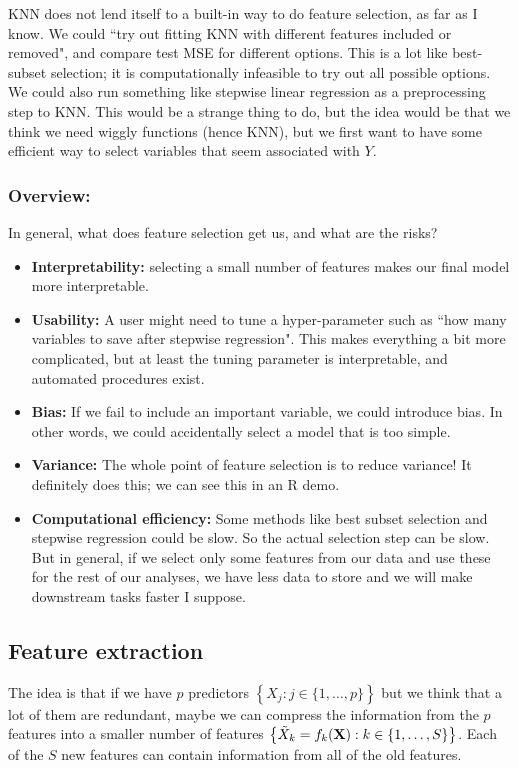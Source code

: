 KNN does not lend itself to a built-in way to do feature selection, as far as I know. We could ``try out fitting KNN with different features included or removed", and compare test MSE for different options. This is a lot like best-subset selection; it is computationally infeasible to try out all possible options. We could also run something like stepwise linear regression as a preprocessing step to KNN. This would be a strange thing to do, but the idea would be that we think we need wiggly functions (hence KNN), but we first want to have some efficient way to select variables that seem associated with $Y$.

\subsubsection{Overview:}

In general, what does feature selection get us, and what are the risks? 
\begin{itemize}
\item \textbf{Interpretability:} selecting a small number of features makes our final model more interpretable. 
\item \textbf{Usability:} A user might need to tune a hyper-parameter such as ``how many variables to save after stepwise regression". This makes everything a bit more complicated, but at least the tuning parameter is interpretable, and automated procedures exist. 
\item \textbf{Bias:} If we fail to include an important variable, we could introduce bias. In other words, we could accidentally select a model that is too simple. 
\item \textbf{Variance:} The whole point of feature selection is to reduce variance! It definitely does this; we can see this in an R demo.
\item \textbf{Computational efficiency:} Some methods like best subset selection and stepwise regression could be slow. So the actual selection step can be slow. But in general, if we select only some features from our data and use these for the rest of our analyses, we have less data to store and we will make downstream tasks faster I suppose. 
\end{itemize}


\subsection{Feature extraction}

The idea is that if we have $p$ predictors $\left\{X_j : j \in \{1,\ldots,p\}\right\}$ but we think that a lot of them are redundant, maybe we can compress the information from the $p$ features into a smaller number of features $\left\{ \tilde{X}_k = f_k(\bold{X}) : k \in \{1,\ldots, S\} \right\}$. Each of the $S$ new features can contain information from all of the old features.  

